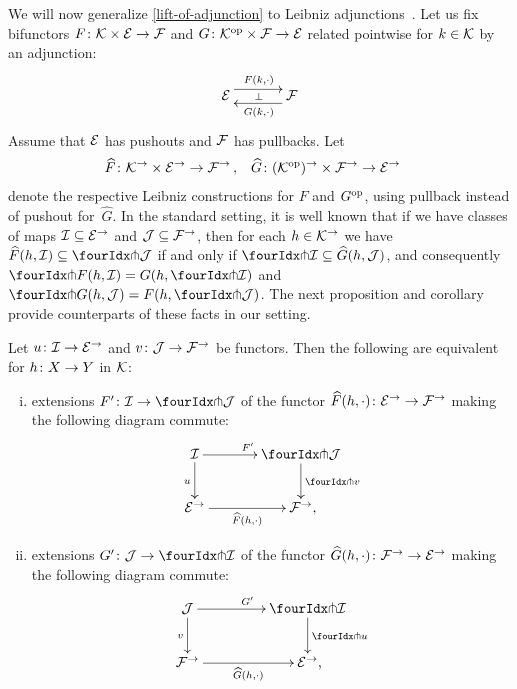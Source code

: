 \documentclass[reqno,10pt,a4paper,oneside,draft]{amsart}
\begin{document}





We will now generalize \cref{lift-of-adjunction} to Leibniz adjunctions~\cite{riehl-verity:reedy}.
Let us fix bifunctors $F \co \cal{K} \times \cal{E} \to \cal{F}$ and $G \co \cal{K}^{\op} \times \cal{F} \to \cal{E}$ related pointwise for $k \in \cal{K}$ by an adjunction:
\[
\xymatrix@C+1em{
  \cal{E}
  \ar@<5pt>[r]^{F(k, \arghole)}
  \ar@{}[r]|{\bot}
&
  \cal{F}
  \ar@<5pt>[l]^{G(k, \arghole)}
}
\]
Assume that $\cal{E}$ has pushouts and $\cal{F}$ has pullbacks.
Let
\[
\begin{aligned}
  \widehat{F} &\co \cal{K}^\to \times \cal{E}^\to \to \cal{F}^\to
\, ,&
  \widehat{G} &\co (\cal{K}^{\op})^\to \times \cal{F}^\to \to \cal{E}^\to
\end{aligned}
\]
denote the respective Leibniz constructions for $F$ and $G^{\op}$, using pullback instead of pushout for~$\widehat{G}$.
In the standard setting, it is well known that if we have classes of maps $\cal{I} \subseteq \cal{E}^\to$ and $\cal{J} \subseteq \cal{F}^\to$, then for each $h \in \cal{K}^\to$ we have $\widehat{F}(h, \cal{I}) \subseteq \liftl{\cal{J}}$ if and only if $\liftr{\cal{I}} \subseteq \widehat{G}(h, \cal{J})$, and consequently $\liftr{F(h, \cal{I})} = G(h, \liftr{\cal{I}})$ and $\liftl{G(h, \cal{J})} = F(h, \liftl{\cal{J}})$.
The next proposition and corollary provide counterparts of these facts in our setting.

\begin{proposition} \label{lift-of-leibniz-adjunction}
Let $u \co \cal{I} \to \cal{E}^\to$ and $v \co \cal{J} \to \cal{F}^\to$ be functors. 
Then the following are equivalent for $h \co X \to Y$ in $\cal{K}$:
\begin{enumerate}[(i)]
\item extensions $F' \co \cal{I} \to \liftl{\cal{J}}$ of the functor $\widehat{F}(h, \arghole) \co \cal{E}^\to \to \cal{F}^\to$ making the following diagram commute:
\[
\xymatrix@C=1.2cm{
  \cal{I}
  \ar[r]^{F'}
  \ar[d]_{u}
&
  \liftl{\cal{J}}
  \ar[d]^{\liftl{v}}
\\
  \cal{E}^\to
  \ar[r]_-{\widehat{F}(h, \arghole)}
&
  \cal{F}^\to
\rlap{,}}
\]
\item extensions $G' \co \cal{J} \to \liftr{\cal{I}}$ of the functor $\widehat{G}(h, \arghole) \co \cal{F}^\to \to \cal{E}^\to$ making the following diagram commute:
\[
\xymatrix@C+2em{
    \cal{J}
      \ar[d]_{v}
      \ar[r]^{G'}
&
  \liftr{\cal{I}}
    \ar[d]^{\liftr{u}}
\\
  \cal{F}^\to
   \ar[r]_-{\widehat{G}(h, \arghole)}
&
  \cal{E}^\to
\rlap{,}}
\]
\end{enumerate}
\end{proposition}
\end{document}
